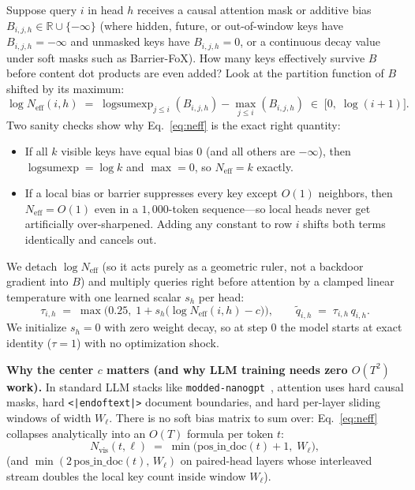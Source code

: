 \documentclass[10pt]{article}
\newcommand{\neff}{N_{\mathrm{eff}}}
\newcommand{\nvis}{N_{\mathrm{vis}}}
\newcommand{\R}{\mathbb{R}}
\begin{document}
Suppose query $i$ in head $h$ receives a causal attention mask or additive bias $B_{i,j,h} \in \R \cup \{-\infty\}$ (where hidden, future, or out-of-window keys have $B_{i,j,h} = -\infty$ and unmasked keys have $B_{i,j,h} = 0$, or a continuous decay value under soft masks such as Barrier-FoX). How many keys effectively survive $B$ before content dot products are even added? Look at the partition function of $B$ shifted by its maximum:
\begin{equation}
  \log \neff(i, h) \;=\; \operatorname{logsumexp}_{j \le i}(B_{i,j,h}) - \max_{j \le i}(B_{i,j,h}) \;\in\; \big[0,\; \log(i+1)\big].
  \label{eq:neff}
\end{equation}
Two sanity checks show why Eq.~\eqref{eq:neff} is the exact right quantity:
\begin{itemize}
  \item If all $k$ visible keys have equal bias $0$ (and all others are $-\infty$), then $\operatorname{logsumexp} = \log k$ and $\max = 0$, so $\neff = k$ exactly.
  \item If a local bias or barrier suppresses every key except $O(1)$ neighbors, then $\neff = O(1)$ even in a $1{,}000$-token sequence---so local heads never get artificially over-sharpened. Adding any constant to row $i$ shifts both terms identically and cancels out.
\end{itemize}
We detach $\log \neff$ (so it acts purely as a geometric ruler, not a backdoor gradient into $B$) and multiply queries right before attention by a clamped linear temperature with one learned scalar $s_h$ per head:
\begin{equation}
  \tau_{i,h} \;=\; \max\!\Big(0.25,\; 1 + s_h\big(\log \neff(i, h) - c\big)\Big), \qquad \tilde{q}_{i,h} \;=\; \tau_{i,h}\, q_{i,h}.
  \label{eq:tau}
\end{equation}
We initialize $s_h = 0$ with zero weight decay, so at step $0$ the model starts at exact identity ($\tau = 1$) with no optimization shock.

\textbf{Why the center $c$ matters (and why LLM training needs zero $O(T^2)$ work).}
In standard LLM stacks like \texttt{modded-nanogpt}~\cite{jordan2024}, attention uses hard causal masks, hard \texttt{<|endoftext|>} document boundaries, and hard per-layer sliding windows of width $W_\ell$. There is no soft bias matrix to sum over: Eq.~\eqref{eq:neff} collapses analytically into an $O(T)$ formula per token $t$:
\begin{equation}
  \nvis(t, \ell) \;=\; \min\!\big(\mathrm{pos\_in\_doc}(t) + 1,\; W_\ell\big),
  \label{eq:nvis}
\end{equation}
(and $\min(2\,\mathrm{pos\_in\_doc}(t),\, W_\ell)$ on paired-head layers whose interleaved stream doubles the local key count inside window $W_\ell$).
\end{document}
